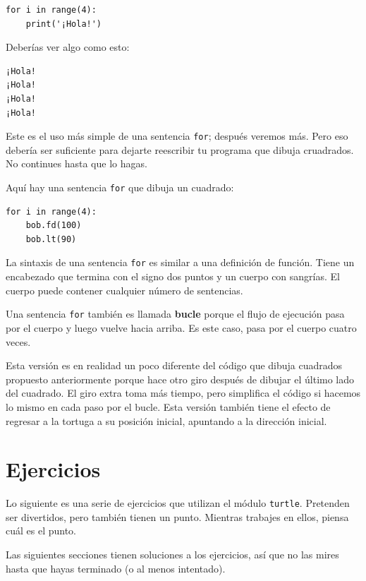 \documentclass[10pt]{book}
\begin{document}
\begin{verbatim}
for i in range(4):
    print('¡Hola!')
\end{verbatim}
%
Deberías ver algo como esto:

\begin{verbatim}
¡Hola!
¡Hola!
¡Hola!
¡Hola!
\end{verbatim}
%
Este es el uso más simple de una sentencia {\tt for}; después veremos
más.  Pero eso debería ser suficiente para dejarte reescribir tu
programa que dibuja cruadrados.  No continues hasta que lo hagas.

Aquí hay una sentencia {\tt for} que dibuja un cuadrado:

\begin{verbatim}
for i in range(4):
    bob.fd(100)
    bob.lt(90)
\end{verbatim}
%
La sintaxis de una sentencia {\tt for} es similar a una definición
de función.  Tiene un encabezado que termina con el signo dos puntos y un cuerpo
con sangrías.  El cuerpo puede contener cualquier número de sentencias.

Una sentencia {\tt for} también es llamada {\bf bucle} porque
el flujo de ejecución pasa por el cuerpo y luego vuelve
hacia arriba.  Es este caso, pasa por el cuerpo cuatro veces.

Esta versión es en realidad un poco diferente del código
que dibuja cuadrados propuesto anteriormente porque hace otro giro después
de dibujar el último lado del cuadrado.  El giro extra toma
más tiempo, pero simplifica el código si hacemos lo mismo
en cada paso por el bucle.  Esta versión también tiene el efecto
de regresar a la tortuga a su posición inicial, apuntando a
la dirección inicial.

\section{Ejercicios}

Lo siguiente es una serie de ejercicios que utilizan el módulo {\tt turtle}.  Pretenden
ser divertidos, pero también tienen un punto.  Mientras trabajes en
ellos, piensa cuál es el punto.

Las siguientes secciones tienen soluciones a los ejercicios, así que
no las mires hasta que hayas terminado (o al menos intentado).
\end{document}
